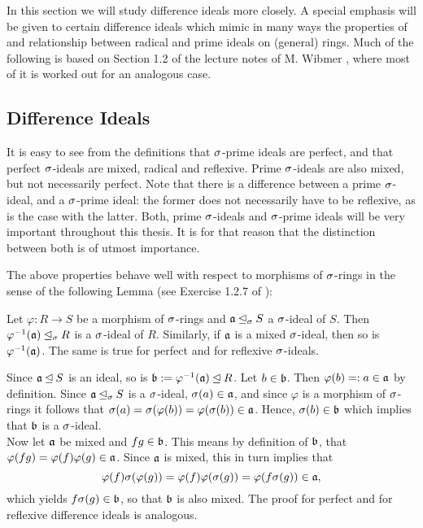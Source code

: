In this section we will study difference ideals more closely. A special emphasis will be given to certain difference ideals which mimic in many ways the properties of and relationship between radical and prime ideals on (general) rings.
Much of the following is based on Section 1.2 of the lecture notes of M. Wibmer \cite{wibmer}, where most of it is worked out for an analogous case. \\

\subsection{Difference Ideals}

\begin{rem}
It is easy to see from the definitions that $\sigma$-prime ideals are perfect, and that perfect $\sigma$-ideals are mixed, radical and reflexive. Prime $\sigma$-ideals are also mixed, but not necessarily perfect. Note that there is a difference between a prime $\sigma$-ideal, and a $\sigma$-prime ideal:
the former does not necessarily have to be reflexive, as is the case with the latter. Both, prime $\sigma$-ideals and $\sigma$-prime ideals will be very important throughout this thesis. It is for that reason that the distinction between both is of utmost importance.
\end{rem}

The above properties behave well with respect to morphisms of $\sigma$-rings in the sense of the following Lemma (see Exercise 1.2.7 of \cite{wibmer}):
\begin{lem}\label{bijmapping}
Let $\varphi: R \rightarrow S$ be a morphism of $\sigma$-rings and $\mathfrak{a} \unlhd_{\sigma} S$ a $\sigma$-ideal of $S$. Then $\varphi^{-1}(\mathfrak{a}) \unlhd_{\sigma} R$ is a $\sigma$-ideal of $R$. Similarly, if $\mathfrak{a}$ is a mixed $\sigma$-ideal, then so is $\varphi^{-1}(\mathfrak{a})$. The same is true for perfect and for reflexive $\sigma$-ideals.
\begin{bew}
Since $\mathfrak{a} \unlhd S$ is an ideal, so is $\mathfrak{b} := \varphi^{-1}(\mathfrak{a}) \unlhd R$. Let $b \in \mathfrak{b}$. Then $\varphi(b) =: a \in \mathfrak{a}$ by definition. Since $\mathfrak{a} \unlhd_{\sigma} S$ is a $\sigma$-ideal, $\sigma(a) \in \mathfrak{a}$, and since $\varphi$ is a morphism of $\sigma$-rings
it follows that $\sigma(a) = \sigma(\varphi(b)) = \varphi (\sigma (b)) \in \mathfrak{a}$. Hence, $\sigma(b) \in \mathfrak{b}$ which implies that $\mathfrak{b}$ is a $\sigma$-ideal. \\
\indent Now let $\mathfrak{a}$ be mixed and $fg \in \mathfrak{b}$. This means by definition of $\mathfrak{b}$, 
that $\varphi(fg) = \varphi(f) \varphi(g) \in \mathfrak{a}$. Since $\mathfrak{a}$ is mixed, this in turn implies that $$\varphi(f) \sigma( \varphi(g)) = \varphi(f) \varphi(\sigma(g)) = \varphi(f\sigma(g)) \in \mathfrak{a},$$ which yields $f\sigma(g) \in \mathfrak{b}$, so that $\mathfrak{b}$ is also mixed. 
The proof for perfect and for reflexive difference ideals is analogous.
\end{bew}
\end{lem}

